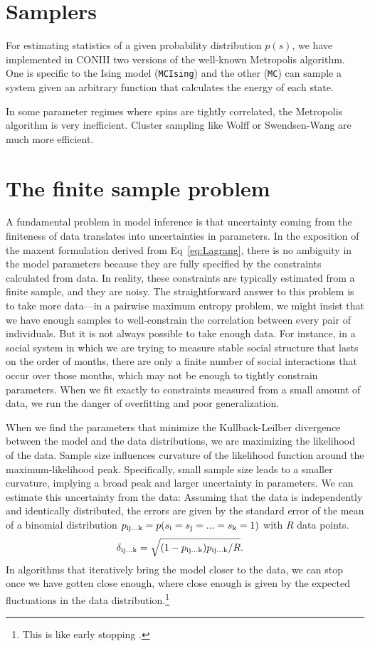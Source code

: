 \documentclass[aps,prl,twocolumn,nofootinbib]{revtex4-1}
\begin{document}
\section{Samplers}
For estimating statistics of a given probability distribution $p(s)$, we have implemented in CONIII two versions of the well-known Metropolis algorithm. One is specific to the Ising model ({\tt MCIsing}) and the other ({\tt MC}) can sample a system given an arbitrary function that calculates the energy of each state.

In some parameter regimes where spins are tightly correlated, the Metropolis algorithm is very inefficient. Cluster sampling like Wolff or Swendsen-Wang are much more efficient.

\section{The finite sample problem}
A fundamental problem in model inference is that uncertainty coming
from the finiteness of data translates into uncertainties in parameters.
In the exposition of the maxent formulation derived from Eq~\ref{eq:Lagrang}, there is no ambiguity in the model parameters because they are fully specified by the constraints calculated from data. In reality, these constraints are typically estimated from a finite sample, and they are noisy.
The straightforward answer to this problem is to take more data---in a pairwise
maximum entropy problem, we might insist that we have enough samples to well-constrain
the correlation between every pair of individuals.  But it is not always possible
to take enough data.  For instance, in a social system in which we are trying to
measure stable social structure that lasts on the order of months, there are only
a finite number of social interactions that occur over those months, which may
not be enough to tightly constrain parameters. When we fit exactly to constraints measured from a small amount of data, we run the danger of overfitting and poor generalization.

When we find the parameters that minimize the Kullback-Leilber divergence between the model and the data distributions, we are maximizing the likelihood of the data. 
Sample size influences curvature of the likelihood function around the maximum-likelihood peak.  Specifically, small sample size leads to a smaller curvature, implying a broad peak and larger uncertainty in parameters.
We can estimate this uncertainty from the data: Assuming that the data is independently and identically distributed, the errors are given by the standard error of the mean of a binomial distribution \mbox{$p_{\rm ij...k} = p(s_{\rm i}=s_{\rm j}=...=s_{\rm k}=1)$} with $R$ data points.
\begin{align}
	\delta_{\rm ij...k} &= \sqrt{(1-p_{\rm ij...k})p_{\rm ij...k}/R}.
\end{align}
In algorithms that iteratively bring the model closer to the data, we can stop once we have gotten close enough, where close enough is given by the expected fluctuations in the data distribution.\footnote{This is like early stopping \cite{}.}
\end{document}
